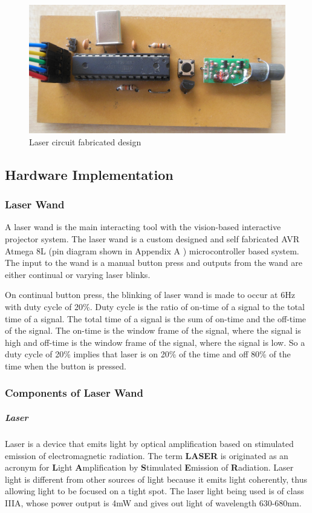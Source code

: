 \documentclass[12pt, a4paper]{article}
\begin{document}
\begin{figure}[htp]
	\centering
	\includegraphics[scale=0.2]{front.png}
	\caption{Laser circuit fabricated design}
	\label{}
\end{figure}

\subsection{Hardware Implementation}
\subsubsection{Laser Wand}

A laser wand is the main interacting tool with the vision-based interactive projector system. The laser wand is a custom designed and self fabricated AVR Atmega 8L (pin diagram shown in Appendix A ) microcontroller based system. The input to the wand is a manual button press and outputs from the wand are either continual or varying laser blinks. 

On continual button press, the blinking of laser wand is made to occur at 6Hz with duty cycle of 20\%. Duty cycle is the ratio of on-time of a signal to the total time of a signal. The total time of a signal is the sum of on-time and the off-time of the signal. The on-time is the window frame of the signal, where the signal is high and off-time is the window frame of the signal, where the signal is low. So a duty cycle of 20\% implies that laser is on 20\% of the time and off 80\% of the time when the button is pressed. 

\subsubsection{Components of Laser Wand}

\subparagraph{Laser}

Laser is a device that emits light by optical amplification based on stimulated emission of electromagnetic radiation. The term \textbf{LASER} is originated as an acronym for \textbf{L}ight \textbf{A}mplification by \textbf{S}timulated \textbf{E}mission of \textbf{R}adiation. Laser light is different from other sources of light because it emits light coherently, thus allowing light to be focused on a tight spot. The laser light being used is of class IIIA, whose power output is 4mW and gives out light of wavelength 630-680nm. 
\end{document}
